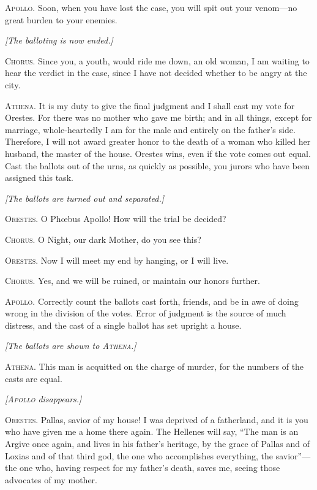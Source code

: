 \documentclass[12pt]{article}
\begin{document}
\textsc{Apollo.} Soon, when you have lost the case, you will spit out your venom---no great burden to your enemies.

\begin{center}
\textit{[The balloting is now ended.]}
\end{center}

\textsc{Chorus.} Since you, a youth, would ride me down, an old woman, I am waiting to hear the verdict in the case, since I have not decided whether to be angry at the city.

\textsc{Athena.} It is my duty to give the final judgment and I shall cast my vote for Orestes. For there was no mother who gave me birth; and in all things, except for marriage, whole-heartedly I am for the male and entirely on the father's side. Therefore, I will not award greater honor to the death of a woman who killed her husband, the master of the house. Orestes wins, even if the vote comes out equal. Cast the ballots out of the urns, as quickly as possible, you jurors who have been assigned this task.

\begin{center}
\textit{[The ballots are turned out and separated.]}
\end{center}

\textsc{Orestes.} O Ph{\oe}bus Apollo! How will the trial be decided?

\textsc{Chorus.} O Night, our dark Mother, do you see this?

\textsc{Orestes.} Now I will meet my end by hanging, or I will live.

\textsc{Chorus.} Yes, and we will be ruined, or maintain our honors further.

\textsc{Apollo.} Correctly count the ballots cast forth, friends, and be in awe of doing wrong in the division of the votes. Error of judgment is the source of much distress, and the cast of a single ballot has set upright a house.

\begin{center}
\textit{[The ballots are shown to \textsc{Athena.}]}
\end{center}

\textsc{Athena.} This man is acquitted on the charge of murder, for the numbers of the casts are equal.

\begin{center}
\textit{[\textsc{Apollo} disappears.]}
\end{center}

\textsc{Orestes.} Pallas, savior of my house! I was deprived of a fatherland, and it is you who have given me a home there again. The Hellenes will say, ``The man is an Argive once again, and lives in his father's heritage, by the grace of Pallas and of Loxias and of that third god, the one who accomplishes everything, the savior''---the one who, having respect for my father's death, saves me, seeing those advocates of my mother.
\end{document}
